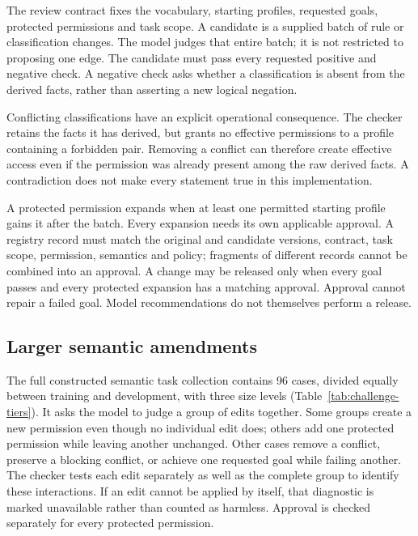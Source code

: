 \documentclass[a4paper,preprint,12pt,numbers,nopreprintline]{elsarticle}
\begin{document}
The review contract fixes the vocabulary, starting profiles, requested goals, protected permissions and task scope. A candidate is a supplied batch of rule or classification changes. The model judges that entire batch; it is not restricted to proposing one edge. The candidate must pass every requested positive and negative check. A negative check asks whether a classification is absent from the derived facts, rather than asserting a new logical negation.

Conflicting classifications have an explicit operational consequence. The checker retains the facts it has derived, but grants no effective permissions to a profile containing a forbidden pair. Removing a conflict can therefore create effective access even if the permission was already present among the raw derived facts. A contradiction does not make every statement true in this implementation.

A protected permission expands when at least one permitted starting profile gains it after the batch. Every expansion needs its own applicable approval. A registry record must match the original and candidate versions, contract, task scope, permission, semantics and policy; fragments of different records cannot be combined into an approval. A change may be released only when every goal passes and every protected expansion has a matching approval. Approval cannot repair a failed goal. Model recommendations do not themselves perform a release.

\subsection{Larger semantic amendments}
The full constructed semantic task collection contains 96 cases, divided equally between training and development, with three size levels (Table~\ref{tab:challenge-tiers}). It asks the model to judge a group of edits together. Some groups create a new permission even though no individual edit does; others add one protected permission while leaving another unchanged. Other cases remove a conflict, preserve a blocking conflict, or achieve one requested goal while failing another. The checker tests each edit separately as well as the complete group to identify these interactions. If an edit cannot be applied by itself, that diagnostic is marked unavailable rather than counted as harmless. Approval is checked separately for every protected permission.
\end{document}
